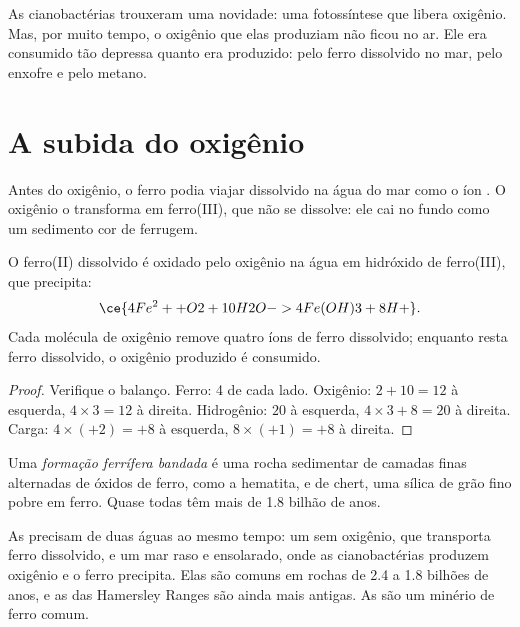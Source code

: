 As cianobactérias trouxeram uma novidade: uma fotossíntese que libera
oxigênio. Mas, por muito tempo, o oxigênio que elas produziam não ficou no
ar. Ele era consumido tão depressa quanto era produzido: pelo ferro
dissolvido no mar, pelo enxofre e pelo metano.

\section{A subida do oxigênio}

Antes do oxigênio, o ferro podia viajar dissolvido na água do mar como o
íon . O oxigênio o transforma em ferro(III), que não se dissolve:
ele cai no fundo como um sedimento cor de ferrugem.

\begin{proposition}\label{prop:g12:early-earth:iron}
O ferro(II) dissolvido é oxidado pelo oxigênio na água em hidróxido de
ferro(III), que precipita:
\[
  \ce{4Fe^2+ + O2 + 10H2O -> 4Fe(OH)3 + 8H+} .
\]
Cada molécula de oxigênio remove quatro íons de ferro dissolvido; enquanto
resta ferro dissolvido, o oxigênio produzido é consumido.
\end{proposition}

\begin{proof}
Verifique o balanço. Ferro: 4 de cada lado. Oxigênio: $2 + 10 = 12$ à
esquerda, $4 \times 3 = 12$ à direita. Hidrogênio: $20$ à esquerda, $4 \times 3 + 8 =
20$ à direita. Carga: $4 \times (+2) = +8$ à esquerda, $8 \times (+1) =
+8$ à direita.
\end{proof}

\begin{definition}\label{def:g12:early-earth:bif}
Uma \emph{formação ferrífera bandada}
é uma rocha sedimentar de camadas finas alternadas de óxidos de ferro, como a
hematita, e de chert, uma sílica de grão fino pobre em ferro. Quase todas
têm mais de 1.8 bilhão de anos.
\end{definition}

As  precisam de duas águas ao mesmo tempo: um
 sem oxigênio, que transporta ferro dissolvido, e um mar
raso e ensolarado, onde as cianobactérias produzem oxigênio e o ferro
precipita. Elas são comuns em rochas de 2.4 a 1.8 bilhões de anos, e as das
Hamersley Ranges são ainda mais antigas. As 
são um minério de ferro comum.

